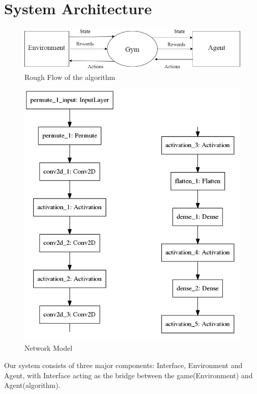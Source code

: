 \documentclass[conference,10pt]{IEEEtran}
\begin{document}
	\section{System Architecture}
	\begin{figure}[]

		\includegraphics[width=\linewidth]{flow.jpg}
		\caption{Rough Flow of the algorithm}
		\label{test}

	\end{figure}
	\begin{figure}[]

		\includegraphics[scale=0.5]{model.png}
		\caption{Network Model}
		\label{model}

	\end{figure}
	Our system consists of three major components: Interface, Environment and Agent, with Interface acting as the bridge between the game(Environment) and Agent(algorithm).
\end{document}

